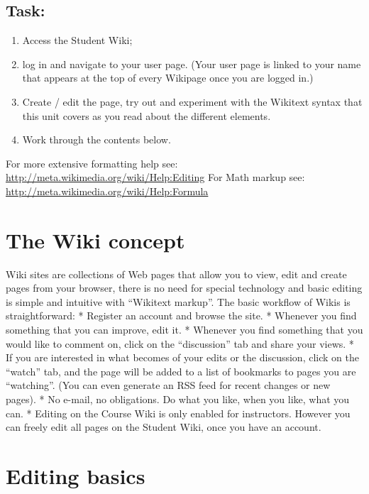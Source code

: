 \documentclass[]{book}
\providecommand{\tightlist}{%
  \setlength{\itemsep}{0pt}\setlength{\parskip}{0pt}}
\begin{document}
\subsection{Task:}\label{task}

\begin{enumerate}
\def\labelenumi{\arabic{enumi}.}
\tightlist
\item
  Access the Student Wiki;
\item
  log in and navigate to your user page. (Your user page is linked to
  your name that appears at the top of every Wikipage once you are
  logged in.)
\item
  Create / edit the page, try out and experiment with the Wikitext
  syntax that this unit covers as you read about the different elements.
\item
  Work through the contents below.
\end{enumerate}

For more extensive formatting help see:
\url{http://meta.wikimedia.org/wiki/Help:Editing} For Math markup see:
\url{http://meta.wikimedia.org/wiki/Help:Formula}

\section{The Wiki concept}\label{the-wiki-concept}

Wiki sites are collections of Web pages that allow you to view, edit and
create pages from your browser, there is no need for special technology
and basic editing is simple and intuitive with ``Wikitext markup''. The
basic workflow of Wikis is straightforward: * Register an account and
browse the site. * Whenever you find something that you can improve,
edit it. * Whenever you find something that you would like to comment
on, click on the ``discussion'' tab and share your views. * If you are
interested in what becomes of your edits or the discussion, click on the
``watch'' tab, and the page will be added to a list of bookmarks to
pages you are ``watching''. (You can even generate an RSS feed for
recent changes or new pages). * No e-mail, no obligations. Do what you
like, when you like, what you can. * Editing on the Course Wiki is only
enabled for instructors. However you can freely edit all pages on the
Student Wiki, once you have an account.

\section{Editing basics}\label{editing-basics}
\end{document}
